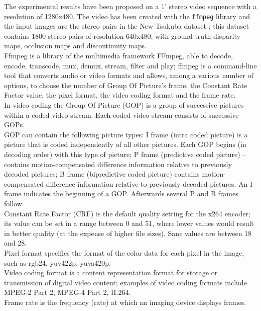 The experimental results have been proposed on a 1' stereo video sequence with a resolution of 1280x480. The video has been created with the \texttt{ffmpeg} library \cite{ffmpeg} and the input images are the stereo pairs in the New Tsukuba dataset \cite{tsu}; this dataset contains 1800 stereo pairs of resolution 640x480, with ground truth disparity maps, occlusion maps and discontinuity maps.\\
Ffmpeg is a library of the multimedia framework FFmpeg, able to decode, encode, transcode, mux, demux, stream, filter and play; ffmpeg is a command-line tool that converts audio or video formats and allows, among a various number of options, to choose the number of Group Of Picture's frame, the Constant Rate Factor value, the pixel format, the video coding format and the frame rate.\\
In video coding the Group Of Picture (GOP) is a group of successive pictures within a coded video stream. Each coded video stream consists of successive GOPs.\\
GOP can contain the following picture types:
I frame (intra coded picture) is  a picture that is coded independently of all other pictures. Each GOP begins (in decoding order) with this type of picture; P frame (predictive coded picture) – contains motion-compensated difference information relative to previously decoded pictures;  B frame (bipredictive coded picture) contains motion-compensated difference information relative to previously decoded pictures. An I frame indicates the beginning of a GOP. Afterwards several P and B frames follow.\\
Constant Rate Factor (CRF) is the default quality setting for the x264 encoder; its value can be set in a range between 0 and 51, where lower values would result in better quality (at the expense of higher file sizes). Sane values are between 18 and 28. \\
Pixel format specifies the format of the color data for each pixel in the image, such as rgb24, yuv422p, yuva420p.\\
Video coding format is a content representation format for storage or transmission of digital video content; examples of video coding formats include MPEG-2 Part 2, MPEG-4 Part 2, H.264.\\
Frame rate is the frequency (rate) at which an imaging device displays frames.\\

